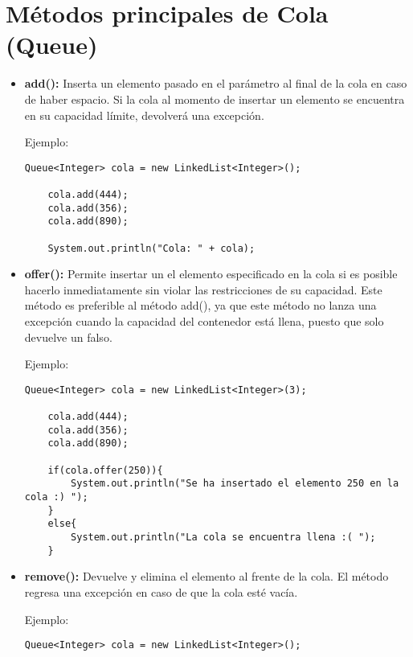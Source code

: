 \documentclass[12pt, letterpaper]{article} %
\begin{document}
\section*{Métodos principales de Cola (Queue)}
\begin{itemize}
    \item \textbf{add():} Inserta un elemento pasado en el parámetro al final de la cola en caso de haber espacio. Si la cola al momento de insertar un elemento se encuentra en su capacidad límite, devolverá una excepción.
    
    Ejemplo:
    \lstset{language = Java, breaklines=true, basicstyle=\footnotesize}
    \begin{lstlisting}[frame=single]
    Queue<Integer> cola = new LinkedList<Integer>();

    cola.add(444);
    cola.add(356);
    cola.add(890);

    System.out.println("Cola: " + cola);
    \end{lstlisting}

    \item \textbf{offer():} Permite insertar un el elemento especificado en la cola si es posible hacerlo inmediatamente sin violar las restricciones de su capacidad. Este método es preferible al método add(), ya que este método no lanza una excepción cuando la capacidad del contenedor está llena, puesto que solo devuelve un falso.
    
    Ejemplo:
    \lstset{language = Java, breaklines=true, basicstyle=\footnotesize}
    \begin{lstlisting}[frame=single]
    Queue<Integer> cola = new LinkedList<Integer>(3);

    cola.add(444);
    cola.add(356);
    cola.add(890);

    if(cola.offer(250)){
        System.out.println("Se ha insertado el elemento 250 en la cola :) ");
    }
    else{
    	System.out.println("La cola se encuentra llena :( ");
    }
    \end{lstlisting}

    \item \textbf{remove():} Devuelve y elimina el elemento al frente de la cola. El método regresa una excepción en caso de que la cola esté vacía.
    
    Ejemplo:
    \lstset{language = Java, breaklines=true, basicstyle=\footnotesize}
    \begin{lstlisting}[frame=single]
    Queue<Integer> cola = new LinkedList<Integer>();


\end{lstlisting}
\end{itemize}
\end{document}
